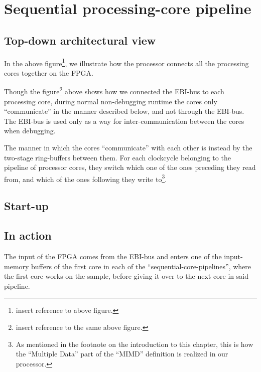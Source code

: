 \FloatBarrier
\section{Sequential processing-core pipeline}\label{section:sequential-pipeline}

\FloatBarrier
\subsection{Top-down architectural view}


In the above figure\footnote{insert
reference to above figure.}, we illustrate how the processor connects all the
processing cores together on the FPGA.

Though the figure\footnote{
insert reference to the same above figure.} above shows how we connected the
EBI-bus\cite{efm_ebi} to each processing core, during normal non-debugging
runtime the cores only ``communicate'' in the manner described below, and not
through the EBI-bus. The EBI-bus is used only as a way for inter-communication
between the cores when debugging.

The manner in which the cores ``communicate'' with each other is instead by the
two-stage ring-buffers between them. For each clockcycle belonging to the
pipeline of processor cores, they switch which one of the ones preceding they
read from, and which of the ones following they write to\footnote{As mentioned
in the footnote on the introduction to this chapter, this is how the ``Multiple
Data'' part of the ``MIMD'' definition is realized in our processor.}.

\FloatBarrier
\subsection{Start-up}\label{subsection:fpga-pipeline-startup}


\subsection{In action}

The input of the FPGA comes from the EBI-bus and enters one of the input-memory buffers of the first core in each of the
``sequential-core-pipelines'', where the first core works on the sample, before
giving it over to the next core in said pipeline.
